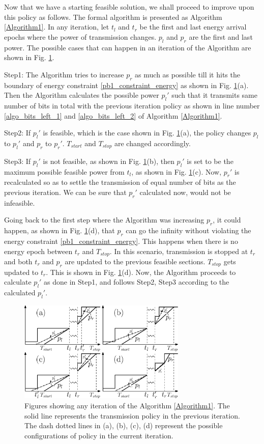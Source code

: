 Now that we have a starting feasible solution, we shall proceed to improve upon this policy as follows. The formal algorithm is presented as Algorithm \ref{Algorithm1}. In any iteration, let $t_{l}$ and $t_{r}$ be the first and last energy arrival epochs where the power of transmission changes. $p_l$ and $p_r$ are the first and last power. The possible cases that can happen in an iteration of the Algorithm are shown in Fig. \ref{figure_Algorithm1}. 

Step1: The Algorithm tries to increase $p_r$ as much as possible till it hits the boundary of energy constraint \eqref{pb1_constraint_energy} as shown in Fig. \ref{figure_Algorithm1}(a). Then the Algorithm calculates the possible power $p_l'$ such that it transmits same number of bits in total with the previous iteration policy as shown in line number \ref{algo_bits_left_1} and \ref{algo_bits_left_2} of Algorithm \ref{Algorithm1}. 

Step2: If $p_l'$ is feasible, which is the case shown in Fig. \ref{figure_Algorithm1}(a), the policy changes $p_l$ to $p_l'$ and $p_r$ to $p_r'$. $T_{start}$ and $T_{stop}$ are changed accordingly. 

Step3: If $p_l'$ is not feasible, as shown in Fig. \ref{figure_Algorithm1}(b), then $p_l'$ is set to be the maximum possible feasible power from $t_l$, as shown in Fig. \ref{figure_Algorithm1}(c). Now, $p_r'$ is recalculated so as to settle the transmission of equal number of bits as the previous iteration. We can be sure that $p_r'$ calculated now, would not be infeasible.  

Going back to the first step where the Algorithm was increasing $p_r$, it could happen, as shown in Fig. \ref{figure_Algorithm1}(d), that $p_r$ can go the infinity without violating the energy constraint \ref{pb1_constraint_energy}. This happens when there is no energy epoch between $t_r$ and $T_{stop}$. In this scenario, transmission is stopped at $t_r$ and both $t_r$ and $p_r$ are updated to the previous feasible sections. $T_{stop}$ gets updated to $t_r$. This is shown in Fig. \ref{figure_Algorithm1}(d). Now, the Algorithm proceeds to calculate $p_l'$ as done in Step1, and follows Step2, Step3 according to the calculated $p_l'$.

\begin{figure}
\label{figure_Algorithm1}
\centering
  \centerline{\includegraphics[width=8cm]{Algorithm1.eps}}
\caption{Figures showing any iteration of the Algorithm \ref{Algorithm1}. The solid line represents the transmission policy in the previous iteration. The dash dotted lines in (a), (b), (c), (d) represent the possible configurations of policy in the current iteration.}
\end{figure}

